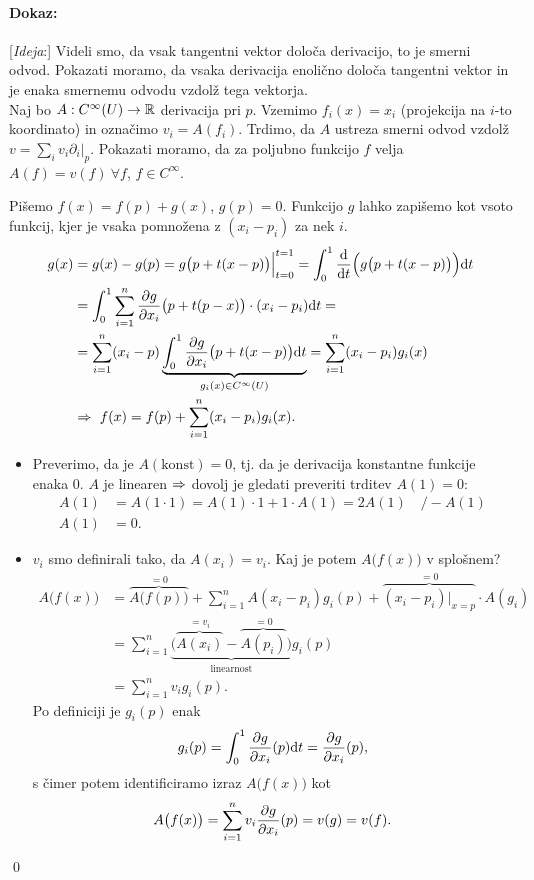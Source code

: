 \paragraph{Dokaz:}
[\emph{Ideja}:] Videli smo, da vsak tangentni vektor dolo\v ca derivacijo, to je smerni odvod. Pokazati moramo, da vsaka derivacija
enoli\v cno dolo\v ca tangentni vektor in je enaka smernemu odvodu vzdol\v z tega vektorja.\\[6pt]

Naj bo $A : C^\infty(U) \to \mathbb{R}$ derivacija pri $p$. Vzemimo $f_i(x) = x_i$ (projekcija na $i$-to koordinato) in ozna\v cimo
$v_i = A(f_i)$. Trdimo, da $A$ ustreza smerni odvod vzdol\v z $v = \sum_i v_i \partial_i |_p$. Pokazati moramo, da za poljubno
funkcijo $f$ velja $A(f) = v(f)\ \forall f$, $f \in C^\infty$.

Pi\v semo $f(x) = f(p) + g(x)$, $g(p) = 0$. Funkcijo $g$ lahko zapi\v semo kot vsoto funkcij, kjer je vsaka pomno\v zena z $(x_i - p_i)$
za nek $i$.
\begin{align*}
	g(x) &= g(x) - g(p) = g\big(p + t(x - p)\big)\Big|_{t = 0}^{t = 1} = \int_0^1 \frac{\text{d}}{\text{d} t}\Big(g\big(p + t(x - p)\big)\Big)\text{d} t \\
	&= \int_0^1 \sum_{i = 1}^n \frac{\partial g}{\partial x_i}\big(p + t(p - x)\big) \cdot (x_i - p_i) \text{d} t = \\
	&= \sum_{i = 1}^n (x_i - p) \underbrace{\int_0^1 \frac{\partial g}{\partial x_i} \big(p + t(x - p)\big)\text{d} t}_{g_i (x) \in C^\infty(U)} =
		\sum_{i = 1}^n (x_i - p_i)g_i (x) \\
	&\Rightarrow\ f(x) = f(p) + \sum_{i = 1}^n (x_i - p_i) g_i(x).
\end{align*}
\begin{itemize}
	\item{Preverimo, da je $A(\text{konst}) = 0$, tj. da je derivacija konstantne funkcije enaka 0. $A$ je linearen $\Rightarrow$ dovolj je gledati
		preveriti trditev $A(1) = 0$:
		\begin{align*}
			A(1) &= A(1 \cdot 1) = A(1) \cdot 1 + 1 \cdot A(1) = 2 A(1)\quad \slash - A(1) \\
			A(1) &= 0.
		\end{align*}}
	\item{$v_i$ smo definirali tako, da $A(x_i) = v_i$. Kaj je potem $A\big(f(x)\big)$ v splo\v snem?
		\begin{align*}
			A\big(f(x)\big) &= \overbrace{A\big(f(p)\big)}^{= 0} + \sum_{i = 1}^n A(x_i - p_i)g_i(p) +
				\overbrace{(x_i - p_i)\Big|_{x = p}}^{= 0} \cdot A(g_i) \\
			&= \sum_{i = 1}^n \underbrace{\Big(\overbrace{A(x_i)}^{= v_i} - \overbrace{A(p_i)}^{= 0}\Big)}_\text{linearnost} g_i(p) \\
			&= \sum_{i = 1}^n v_i g_i (p).
		\end{align*}
		Po definiciji je $g_i (p)$ enak
		\[
			g_i (p) = \int_0^1 \frac{\partial g}{\partial x_i} (p) \text{d} t = \frac{\partial g}{\partial x_i} (p),
		\]
		s \v cimer potem identificiramo izraz $A\big(f(x)\big)$ kot
		\[
			A \big(f(x)\big) = \sum_{i = 1}^n v_i \frac{\partial g}{\partial x_i} (p) = v(g) = v(f).
		\]}
\end{itemize}
\qed


